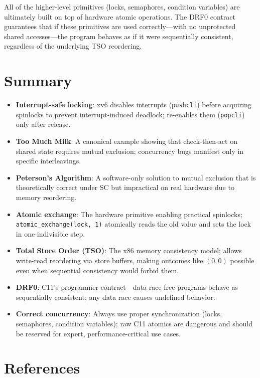 \documentclass[11pt]{article}
\begin{document}
All of the higher-level primitives (locks, semaphores, condition variables) are ultimately built on top of hardware atomic operations. The DRF0 contract guarantees that if these primitives are used correctly---with no unprotected shared accesses---the program behaves as if it were sequentially consistent, regardless of the underlying TSO reordering.

\section{Summary}

\begin{itemize}
    \item \textbf{Interrupt-safe locking}: xv6 disables interrupts (\texttt{pushcli}) before acquiring spinlocks to prevent interrupt-induced deadlock; re-enables them (\texttt{popcli}) only after release.
    \item \textbf{Too Much Milk}: A canonical example showing that check-then-act on shared state requires mutual exclusion; concurrency bugs manifest only in specific interleavings.
    \item \textbf{Peterson's Algorithm}: A software-only solution to mutual exclusion that is theoretically correct under SC but impractical on real hardware due to memory reordering.
    \item \textbf{Atomic exchange}: The hardware primitive enabling practical spinlocks; \texttt{atomic\_exchange(lock, 1)} atomically reads the old value and sets the lock in one indivisible step.
    \item \textbf{Total Store Order (TSO)}: The x86 memory consistency model; allows write-read reordering via store buffers, making outcomes like $(0,0)$ possible even when sequential consistency would forbid them.
    \item \textbf{DRF0}: C11's programmer contract---data-race-free programs behave as sequentially consistent; any data race causes undefined behavior.
    \item \textbf{Correct concurrency}: Always use proper synchronization (locks, semaphores, condition variables); raw C11 atomics are dangerous and should be reserved for expert, performance-critical use cases.
\end{itemize}

\section{References}
\end{document}
